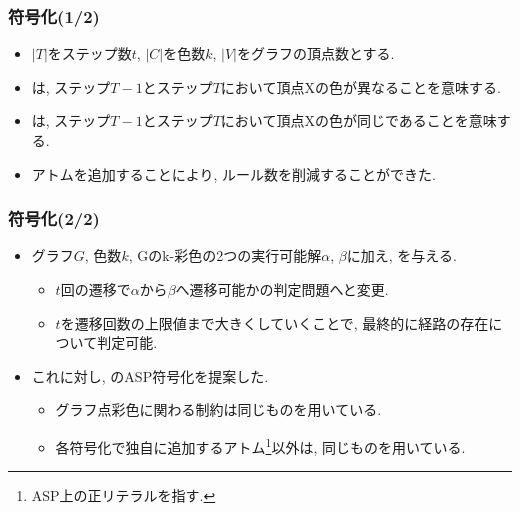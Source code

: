 \documentclass[dvipdfmx,11pt]{beamer}
\begin{document}
\begin{frame}\frametitle{符号化(1/2)}

  \begin{itemize}
    \item $|T|$をステップ数$t$, $|C|$を色数$k$, $|V|$をグラフの頂点数とする.
    
  \end{itemize}

  \begin{table}[t]
    \centering
    
  \end{table}

  \begin{itemize}
    \item {}は, ステップ$T-1$とステップ$T$において頂点Xの色が異なることを意味する.
    \item {}は, ステップ$T-1$とステップ$T$において頂点Xの色が同じであることを意味する.
    \item アトムを追加することにより, ルール数を削減することができた.
  \end{itemize}
  
\end{frame}


\begin{frame}\frametitle{符号化(2/2)}

  \begin{itemize}
    \item グラフ$G$, 色数$k$, Gのk-彩色の2つの実行可能解$\alpha$, $\beta$に加え, を与える.
    \begin{itemize}
      \item $t$回の遷移で$\alpha$から$\beta$へ遷移可能かの判定問題へと変更.
      \item $t$を遷移回数の上限値まで大きくしていくことで, 最終的に経路の存在について判定可能. 
    \end{itemize}
    \item これに対し, のASP符号化を提案した. 
    \begin{itemize}
      \item グラフ点彩色に関わる制約は同じものを用いている.
      \item 各符号化で独自に追加するアトム\footnote{ASP上の正リテラルを指す.}以外は, 同じものを用いている.
    \end{itemize}
  \end{itemize}


  
\end{frame}
\end{document}
